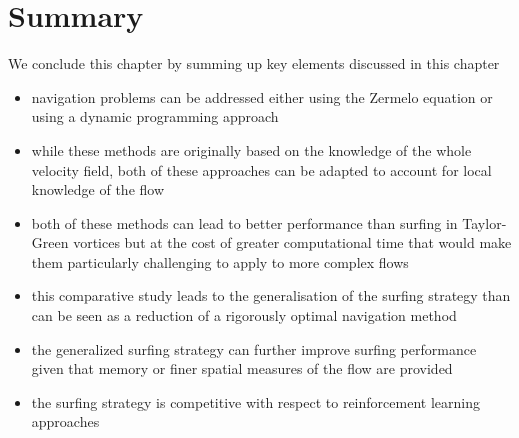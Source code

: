 \section{Summary}

We conclude this chapter by summing up key elements discussed in this chapter
\begin{itemize}
	\item navigation problems can be addressed either using the Zermelo equation or using a dynamic programming approach
	\item while these methods are originally based on the knowledge of the whole velocity field, both of these approaches can be adapted to account for local knowledge of the flow
	\item both of these methods can lead to better performance than surfing in Taylor-Green vortices but at the cost of greater computational time that would make them particularly challenging to apply to more complex flows
	\item this comparative study leads to the generalisation of the surfing strategy than can be seen as a reduction of a rigorously optimal navigation method 
	\item the generalized surfing strategy can further improve surfing performance given that memory or finer spatial measures of the flow are provided
	\item the surfing strategy is competitive with respect to reinforcement learning approaches
\end{itemize}

